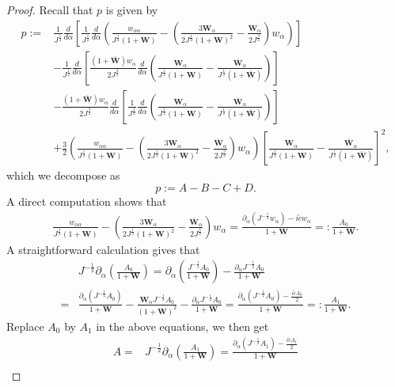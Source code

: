 \documentclass[10pt,a4paper]{amsart}
\newcommand{\al}{\alpha}
\newcommand{\f}{\frac}
\newcommand{\p}{\partial}
\begin{document}
\begin{proof}
Recall that $p$ is given by
\begin{align*}
p:=&\f{1}{J^{\f12}}\f{d}{d\al}\left[\f{1}{J^{\f12}}\f{d}{d\al}\left(\f{w_{\al\al}}{J^{\f12}(1+\mathbf{W})}-\left(\f{3\mathbf{W}_{\al}}{2J^{\f12}(1+\mathbf{W})^2}-\f{\mathbf{W}_{\al}}{2J^{\f32}}\right)w_{\al}\right)\right]\\
&-\f{1}{J^{\f12}}\f{d}{d\al}\left[\frac{(1+\bar{\mathbf{W}})w_{\al}}{2J^{\f32}}\f{d}{d\al}\left(\f{\mathbf{W}_{\al}}{J^{\f12}(1+\mathbf{W})}-\f{\bar{\mathbf{W}}_{\al}}{J^{\f12}(1+\bar{\mathbf{W}})}
\right)\right]\\
&-\frac{(1+\bar{\mathbf{W}})w_{\al}}{2J^{\f32}}\f{d}{d\al}\left[\f{1}{J^{\f12}}\f{d}{d\al}\left(\f{\mathbf{W}_{\al}}{J^{\f12}(1+\mathbf{W})}-\f{\bar{\mathbf{W}}_{\al}}{J^{\f12}(1+\bar{\mathbf{W}})}
\right)\right]\\
&+\f32\left(\f{w_{\al\al}}{J^{\f12}(1+\mathbf{W})}-\left(\f{3\mathbf{W}_{\al}}{2J^{\f12}(1+\mathbf{W})^2}-\f{\bar{\mathbf{W}}_{\al}}{2J^{\f32}}\right)w_{\al}\right)\left[\f{\mathbf{W}_{\al}}{J^{\f12}(1+\mathbf{W})}
-\f{\bar{\mathbf{W}}_{\al}}{J^{\f12}(1+\bar{\mathbf{W}})}\right]^2,
\end{align*}
which we decompose as
\begin{equation*}
   p :=A-B-C+D.
\end{equation*}
A direct computation shows that
\begin{align*}
\f{w_{\al\al}}{J^{\f12}(1+\mathbf{W})}-\left(\f{3\mathbf{W}_{\al}}{2J^{\f12}(1+\mathbf{W})^2}-\f{\bar{\mathbf{W}}_{\al}}{2J^{\f32}}\right)w_{\al}=\f{\p_{\al}(J^{-\f12}w_{\al})-i\tilde{c}w_{\al}}{1+\mathbf{W}}=:\f{A_0}{1+\mathbf{W}}.
\end{align*}
A straightforward calculation gives that
\begin{align*}
&J^{-\f12}\p_{\al}\left(\frac{A_0}{1+\mathbf{W}}\right)=\p_{\al}\left(\frac{J^{-\f12}A_0}{1+\mathbf{W}}\right)
-\frac{\p_{\al}J^{-\f12}A_0}{1+\mathbf{W}}\\
=&\frac{\p_{\al}\left(J^{-\f12}A_0\right)}{1+\mathbf{W}}-\f{\mathbf{W}_{\al}J^{-\f12}A_0}{(1+\mathbf{W})^2}
-\frac{\p_{\al}J^{-\f12}A_0}{1+\mathbf{W}}
=\f{\p_{\al}(J^{-\f12}A_0)-\f{i\tilde{c}A_0}{2}}{1+\mathbf{W}}=:\f{A_1}{1+\mathbf{W}}.
\end{align*}
Replace $A_0$ by $A_1$ in the above equations, we then get
\begin{align*}
A=&J^{-\f12}\p_{\al}\left(\frac{A_1}{1+\mathbf{W}}\right)=\f{\p_{\al}(J^{-\f12}A_1)-\f{i\tilde{c}A_1}{2}}{1+\mathbf{W}}\\

\end{align*}
\end{proof}
\end{document}
